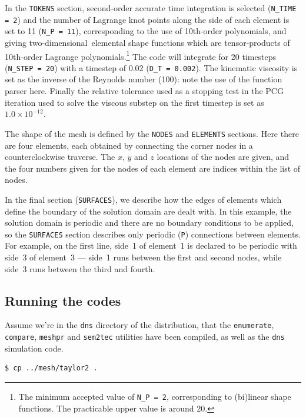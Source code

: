 \documentclass[11pt]{report}
\newcommand\twod{two-di\-men\-sion\-al}
\begin{document}
In the \texttt{TOKENS} section, second-order accurate time integration
is selected (\verb+N_TIME = 2+) and the number of Lagrange knot points
along the side of each element is set to 11 (\verb+N_P = 11+),
corresponding to the use of 10th-order polynomials, and giving
\twod\ elemental shape functions which are tensor-products of
10th-order Lagrange polynomials.\footnote{The minimum accepted value of
\texttt{N\_P = 2},
  corresponding to
  (bi)linear shape functions.  The practicable upper value is around 20.}
The code will integrate for 20 timesteps (\verb+N_STEP = 20+) with a
timestep of 0.02 (\verb+D_T = 0.002+).  The kinematic viscosity is set
as the inverse of the Reynolds number (100): note the use of the
function parser here.  Finally the relative tolerance used as a
stopping test in the PCG iteration used to solve the viscous substep
on the first timestep is set as $1.0\times10^{-12}$.

The shape of the mesh is defined by the \texttt{NODES} and
\texttt{ELEMENTS} sections.  Here there are four elements, each
obtained by connecting the corner nodes in a counterclockwise
traverse.  The $x$, $y$ and $z$ locations of the nodes are given, and
the four numbers given for the nodes of each element are indices
within the list of nodes.

In the final section (\texttt{SURFACES}), we describe how the edges of
elements which define the boundary of the solution domain are dealt
with.  In this example, the solution domain is periodic and there are
no boundary conditions to be applied, so the \texttt{SURFACES} section
describes only periodic (\verb+P+) connections between elements.  For
example, on the first line, side~1 of element~1 is declared to be
periodic with side~3 of element~3 --- side~1 runs between the first
and second nodes, while side~3 runs between the third and fourth.

\subsection{Running the codes}

Assume we're in the \texttt{dns} directory of the distribution, that
the \texttt{enumerate}, \texttt{compare}, \texttt{meshpr} and
\texttt{sem2tec} utilities have been compiled, as well as the
\texttt{dns} simulation code.
{\small
\begin{verbatim}
$ cp ../mesh/taylor2 .
\end{verbatim}
}
\end{document}
